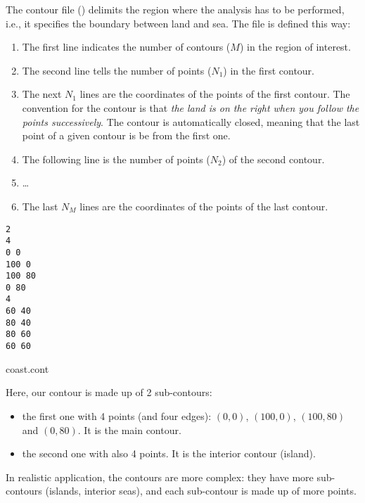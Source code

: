 The contour file () delimits the region where the analysis has to be performed, i.e., it specifies the boundary between land and sea. The file is defined this way:
\begin{enumerate}
\item The first line indicates the number of contours ($M$) in the region of interest.
\item The second line tells the number of points ($N_{1}$) in the first contour.
\item The next $N_1$ lines are the coordinates of the points of the first contour. The convention for the contour is that \textit{the land is on the right when you follow the points successively}. The contour is automatically closed, meaning that the last point of a given contour is be from the first one. 
\item The following line is the number of points ($N_{2}$) of the second contour.
\item \ldots
\item The last $N_M$ lines are the coordinates of the points of the last contour.
\end{enumerate}

\begin{exfile}[htpb]
\begin{footnotesize}
\texttt{2\\
4\\
0 0\\
100 0\\
100 80\\
0 80\\
4\\
60 40\\
80 40\\
80 60\\
60 60} 
\end{footnotesize}
\caption{coast.cont\label{ex:coast.dat}}
\end{exfile}

Here, our contour is made up of 2 sub-contours: 
\begin{itemize}
\item the first one with 4 points (and four edges): $(0,0)$, $(100,0)$, $(100,80)$ and $(0,80)$. It is the main contour.
\item the second one with also 4 points. It is the interior contour (island).
\end{itemize}
In realistic application, the contours are more complex: they have more sub-contours (islands, interior seas), and each sub-contour is made up of more points. 

